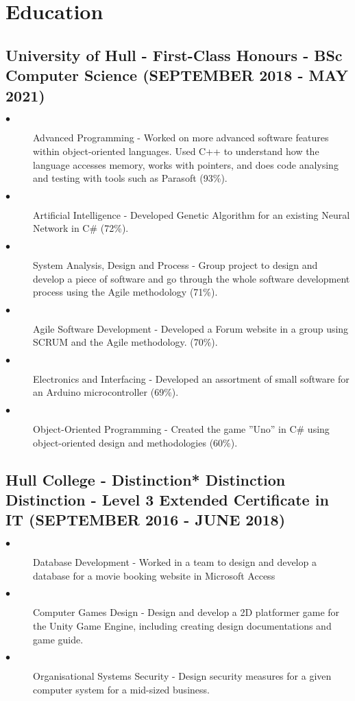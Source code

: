 \documentclass{article}
\begin{document}
\section{Education}
\noindent
\hfill
\begin{minipage}[t]{1\textwidth}
    \subsection{University of Hull - First-Class Honours \textnormal{- BSc Computer Science} \footnotesize{(SEPTEMBER 2018 - MAY 2021)}}
    \normalsize{}
    \begin{description}
        \item[$\bullet$]Advanced Programming - Worked on more advanced software features within object-oriented languages. Used C++ to understand how the language accesses memory, works with pointers, and does code analysing and testing with tools such as Parasoft (93\%).
        \item[$\bullet$]Artificial Intelligence - Developed Genetic Algorithm for an existing Neural Network in C\# (72\%).
        \item[$\bullet$]System Analysis, Design and Process - Group project to design and develop a piece of software and go through the whole software development process using the Agile methodology (71\%).
        \item[$\bullet$]Agile Software Development - Developed a Forum website in a group using SCRUM and the Agile methodology. (70\%).
        \item[$\bullet$]Electronics and Interfacing - Developed an assortment of small software for an Arduino microcontroller (69\%).
        \item[$\bullet$]Object-Oriented Programming - Created the game ”Uno” in C\# using object-oriented design and methodologies (60\%).
    \end{description}
    \subsection{Hull College - Distinction* Distinction Distinction \textnormal{- Level 3 Extended Certificate in IT} \footnotesize{(SEPTEMBER 2016 - JUNE 2018)}}
    \normalsize{}
    \begin{description}
        \item[$\bullet$]Database Development - Worked in a team to design and develop a database for a movie booking website in Microsoft Access
        \item[$\bullet$]Computer Games Design - Design and develop a 2D platformer game for the Unity Game Engine, including creating design documentations and game guide.
        \item[$\bullet$]Organisational Systems Security - Design security measures for a given computer system for a mid-sized business. 
    \end{description}

\end{minipage}
\end{document}
